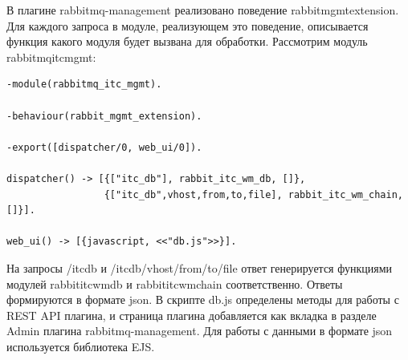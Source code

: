 {В плагине rabbitmq-management реализовано поведение rabbit\underline{\hspace{0.25cm}}mgmt\underline{\hspace{0.25cm}}extension. Для каждого запроса в модуле, реализующем это поведение, описывается функция какого модуля будет вызвана для обработки. Рассмотрим модуль rabbitmq\underline{\hspace{0.25cm}}itc\underline{\hspace{0.25cm}}mgmt: 
\begin{lstlisting}
-module(rabbitmq_itc_mgmt).

-behaviour(rabbit_mgmt_extension).

-export([dispatcher/0, web_ui/0]).

dispatcher() -> [{["itc_db"], rabbit_itc_wm_db, []},
                 {["itc_db",vhost,from,to,file], rabbit_itc_wm_chain, []}].

web_ui() -> [{javascript, <<"db.js">>}].
\end{lstlisting}
На запросы /itc\underline{\hspace{0.25cm}}db и /itc\underline{\hspace{0.25cm}}db/vhost/from/to/file ответ генерируется функциями модулей rabbit\underline{\hspace{0.25cm}}itc\underline{\hspace{0.25cm}}wm\underline{\hspace{0.25cm}}db и rabbit\underline{\hspace{0.25cm}}itc\underline{\hspace{0.25cm}}wm\underline{\hspace{0.25cm}}chain соответственно. Ответы формируются в формате json. В скрипте db.js определены методы для работы с REST API плагина, и страница плагина добавляется как вкладка в разделе Admin плагина rabbitmq-management. Для работы с данными в формате json используется библиотека EJS.

}
